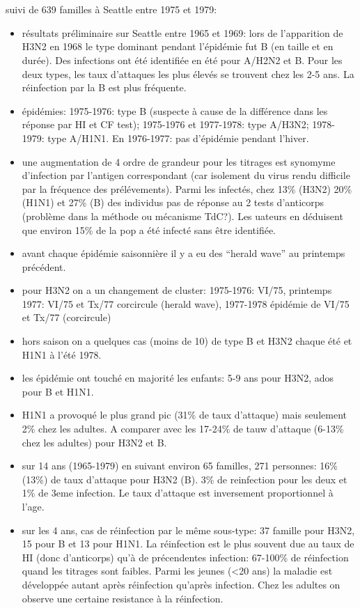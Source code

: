 \documentclass{article}
\begin{document}
\section{\cite{FOX1982}}
suivi de 639 familles à Seattle entre 1975 et 1979:
\begin{itemize}
\item résultats préliminaire sur Seattle entre 1965 et 1969: lors de l'apparition de H3N2 en 1968 le type dominant pendant l'épidémie fut B (en taille et en durée). Des infections ont été identifiée en été pour A/H2N2 et B. Pour les deux types, les taux d'attaques les plus élevés se trouvent chez les 2-5 ans. La réinfection par la B est plus fréquente.
\item épidémies: 1975-1976: type B (suspecte à cause de la différence dans les réponse par HI et CF test); 1975-1976 et 1977-1978: type A/H3N2; 1978-1979: type A/H1N1. En 1976-1977: pas d'épidémie pendant l'hiver.
\item une augmentation de 4 ordre de grandeur pour les titrages est synomyme d'infection par l'antigen correspondant (car isolement du virus rendu difficile par la fréquence des prélévements). Parmi les infectés, chez 13\% (H3N2) 20\%(H1N1) et 27\% (B) des individus pas de réponse au 2 tests d'anticorps (problème dans la méthode ou mécanisme TdC?). Les uateurs en déduisent que environ 15\% de la pop a été infecté sans être identifiée.
\item avant chaque épidémie saisonnière il y a eu des ``herald wave'' au printemps précédent.
\item pour H3N2 on a un changement de cluster: 1975-1976: VI/75, printemps 1977: VI/75 et Tx/77 corcircule (herald wave), 1977-1978 épidémie de VI/75 et Tx/77 (corcircule)
\item hors saison on a quelques cas (moins de 10) de type B  et H3N2 chaque été et H1N1 à l'été 1978.
\item les épidémie ont touché en majorité les enfants: 5-9 ans pour H3N2, ados pour B et H1N1.
\item H1N1 a provoqué le plus grand pic (31\% de taux d'attaque) mais seulement 2\% chez les adultes. A comparer avec les 17-24\% de tauw d'attaque (6-13\% chez les adultes) pour H3N2 et B.
\item sur 14 ans (1965-1979) en suivant environ 65 familles, 271 personnes: 16\% (13\%) de taux d'attaque pour H3N2 (B). 3\% de reinfection pour les deux et 1\% de 3eme infection. Le taux d'attaque est inversement proportionnel à l'age. 
\item sur les 4 ans, cas  de réinfection par le même sous-type: 37 famille pour H3N2, 15 pour B et 13 pour H1N1. La réinfection est le plus souvent due au taux de HI (donc d'anticorps) qu'à de précendentes infection: 67-100\% de réinfection quand les titrages sont faibles. Parmi les jeunes (<20 ans) la maladie est développée autant après réinfection qu'après infection. Chez les adultes on observe une certaine resistance à la réinfection.

\end{itemize}
\end{document}
